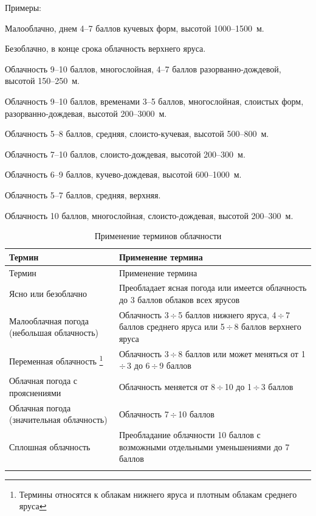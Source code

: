 \documentclass[a4paper, 12pt, twoside, final, book, russian, fittopage, cyremdash, openright]{ncc}
\newcommand{\otdo}{\,\ensuremath{\div}\,}
\begin{document}
Примеры:
\begin{list}{}{}
\item Малооблачно, днем 4--7 баллов кучевых форм, высотой 1000--1500~м.
\item Безоблачно, в конце срока облачность верхнего яруса.
\item Облачность 9--10 баллов, многослойная, 4--7 баллов разорванно-дождевой, высотой 150--250~м.
\item Облачность 9--10 баллов, временами 3--5 баллов, многослойная, слоистых форм, разорванно-дождевая, высотой 200--3000~м.
\item Облачность 5--8 баллов, средняя, слоисто-кучевая, высотой 500--800~м.
\item Облачность 7--10 баллов, слоисто-дождевая, высотой 200--300~м.
\item Облачность 6--9 баллов, кучево-дождевая, высотой 600--1000~м.
\item Облачность 5--7 баллов, средняя, верхняя.
\item Облачность 10 баллов, многослойная, слоисто-дождевая, высотой 200--300~м.
\end{list}

\small
\begin{longtable}{p{}|p{}}
  \toprule
  Термин & Применение термина \\
  \midrule
  \endfirsthead
  \toprule
  Термин & Применение термина \\
  \midrule
  \endhead
  Ясно или безоблачно
         & Преобладает ясная погода или имеется облачность до 3 баллов облаков всех ярусов \\
  \midrule
  Малооблачная погода (небольшая облачность)
         & Облачность 3\otdo5 баллов нижнего яруса, 4\otdo7 баллов среднего яруса или 5\otdo8 баллов верхнего яруса \\
  \midrule
  Переменная облачность \footnote{Термины относятся к облакам нижнего яруса и плотным облакам среднего яруса}
         & Облачность 3\otdo8 баллов или может меняться от 1\otdo3 до 6\otdo9 баллов \\
  \midrule
  Облачная погода с прояснениями
         & Облачность меняется от 8\otdo10 до 1\otdo3 баллов \\
  \midrule
  Облачная погода (значительная облачность)
         & Облачность 7\otdo10 баллов \\
  \midrule
  Сплошная облачность
         & Преобладание облачности 10 баллов с возможными отдельными уменьшениями до 7 баллов \\
  \bottomrule
  \caption{Применение терминов облачности}
\end{longtable}
\end{document}
